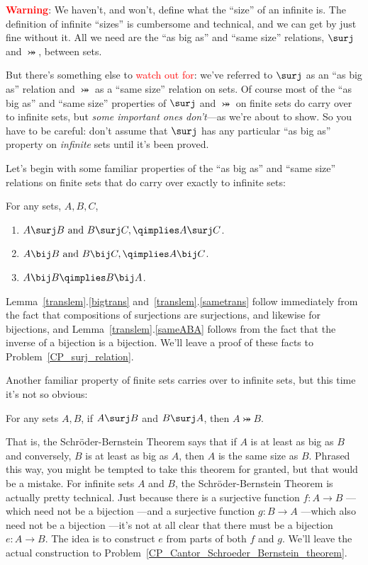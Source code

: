 \textcolor{red}{\textbf{Warning}}: We haven't, and won't, define what the
``size'' of an infinite is.  The definition of infinite ``sizes'' is
cumbersome and technical, and we can get by just fine without it.  All we
need are the ``as big as'' and ``same size'' relations, $\surj$ and
$\bij$, between sets.

But there's something else to \textcolor{red}{watch out for}: we've
referred to $\surj$ as an ``as big as'' relation and $\bij$ as a
``same size'' relation on sets.  Of course most of the ``as big as''
and ``same size'' properties of $\surj$ and $\bij$ on finite sets do
carry over to infinite sets, but \emph{some important ones don't}---as
we're about to show.  So you have to be careful: don't assume that
$\surj$ has any particular ``as big as'' property on \emph{infinite}
sets until it's been proved.

Let's begin with some familiar properties of the ``as big as'' and ``same
size'' relations on finite sets that do carry over exactly to infinite
sets:
\begin{lemma}\label{translem}
For any sets, $A,B,C$,
\begin{enumerate}

\item \label{bigtrans}
$A \surj  B \text{ and } B \surj C, \qimplies  A \surj C$.

\item \label{sametrans} $A \bij B \text{ and } B \bij C, \qimplies A \bij C$.

\item\label{sameABA}
$A \bij B \qimplies B \bij A$.
\end{enumerate}
\end{lemma}

Lemma~\ref{translem}.\ref{bigtrans} and~\ref{translem}.\ref{sametrans}
follow immediately from the fact that compositions of surjections are
surjections, and likewise for bijections, and
Lemma~\ref{translem}.\ref{sameABA} follows from the fact that the
inverse of a bijection is a bijection.  We'll leave a proof of these
facts to Problem~\ref{CP_surj_relation}.

Another familiar property of finite sets carries over to infinite sets,
but this time it's not so obvious:
\begin{theorem}  For any sets $A,B$, if $A \surj B$
  and $B \surj A$, then $A \bij B$.
\end{theorem}

That is, the Schr\"oder-Bernstein Theorem says that if $A$ is at least as
big as $B$ and conversely, $B$ is at least as big as $A$, then $A$ is the
same size as $B$.  Phrased this way, you might be tempted to take this
theorem for granted, but that would be a mistake.  For infinite sets $A$
and $B$, the Schr\"oder-Bernstein Theorem is actually pretty technical.
Just because there is a surjective function $f:A\to B$ ---which need not
be a bijection ---and a surjective function $g:B \to A$ ---which also need
not be a bijection ---it's not at all clear that there must be a bijection
$e:A \to B$.  The idea is to construct $e$ from parts of both $f$ and $g$.
We'll leave the actual construction to
Problem~\ref{CP_Cantor_Schroeder_Bernstein_theorem}.

